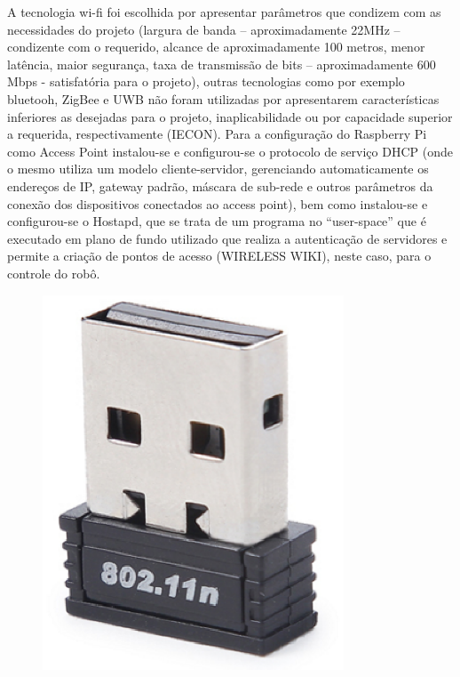 A tecnologia wi-fi foi escolhida por apresentar parâmetros que condizem com as necessidades do projeto (largura de banda – aproximadamente 22MHz – condizente com o requerido, alcance de aproximadamente 100 metros, menor latência, maior segurança, taxa de transmissão de bits – aproximadamente 600 Mbps - satisfatória para o projeto), outras tecnologias como por exemplo bluetooh, ZigBee e UWB não foram utilizadas por apresentarem características inferiores as desejadas para o projeto, inaplicabilidade ou por capacidade superior a requerida, respectivamente (IECON). Para a configuração do Raspberry Pi como Access Point instalou-se e configurou-se o protocolo de serviço DHCP (onde o mesmo utiliza um modelo cliente-servidor, gerenciando automaticamente os endereços de IP, gateway padrão, máscara de sub-rede e outros parâmetros da conexão dos dispositivos conectados ao access point), bem como instalou-se e configurou-se o Hostapd, que se trata de um programa no “user-space” que é executado em plano de fundo utilizado que realiza a autenticação de servidores e permite a criação de pontos de acesso (WIRELESS WIKI), neste caso, para o controle do robô. 

\begin{figure}[H]
    \centering
    \includegraphics[width=0.8\textwidth]{figuras/adaptador_wifi.eps}
    \caption{}
    \label{fig:catia01}
\end{figure}


